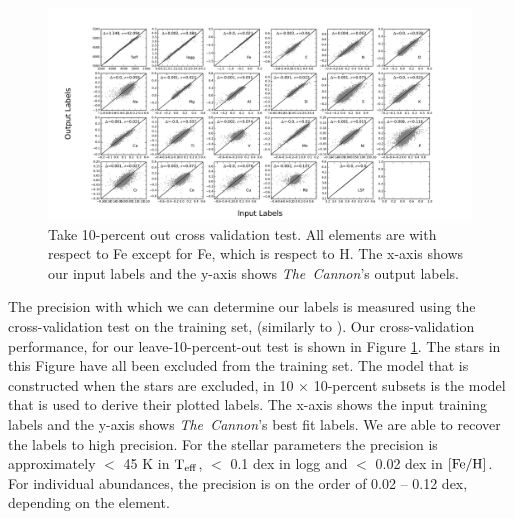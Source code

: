 \documentclass[14pt, preprint2]{aastex6}
\newcommand{\project}[1]{\textsl{#1}}
\newcommand{\tc}{\project{The~Cannon}}
\newcommand{\teff}{\mbox{$\rm T_{eff}$}}
\newcommand{\feh}{\mbox{$\rm [Fe/H]$}}
\begin{document}

\begin{figure}
\includegraphics[scale=0.45]{crossval_5026.pdf} 
  \caption{Take 10-percent out cross validation test. All elements are with respect to Fe except for Fe, which is respect to H. The x-axis shows our input labels and the y-axis shows \tc's output labels. }
\label{fig:cross}
\end{figure}

The precision with which we can determine our labels is measured using the cross-validation test on the training set, (similarly to \citet{Ness2015, Ho2016, Casey2016}). Our cross-validation performance, for our leave-10-percent-out test is shown in Figure \ref{fig:cross}. The stars in this Figure have all been excluded from the training set. The model that is constructed when the stars are excluded, in 10 $\times$ 10-percent subsets is the model that is used to derive their plotted labels. The x-axis shows the input training labels and the y-axis shows \tc's best fit labels. We are able to recover the labels to high precision. For the stellar parameters the precision is approximately $<$ 45 K in \teff, $<$ 0.1 dex in logg and $<$ 0.02 dex in \feh. For individual abundances, the precision is on the order of 0.02 -- 0.12 dex, depending on the element. 
\end{document}
